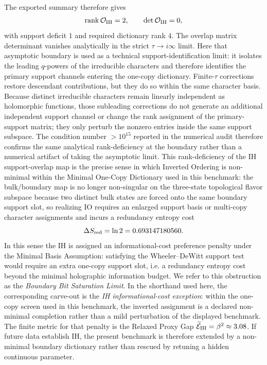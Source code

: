 \documentclass[11pt]{article}
\begin{document}
The exported summary therefore gives
\begin{equation}
 \mathrm{rank}\,\mathcal O_{\rm IH}=2,
 \qquad
 \det\mathcal O_{\rm IH}=0,
\end{equation}
with support deficit $1$ and required dictionary rank $4$. The overlap matrix determinant vanishes analytically in the strict $\tau \to i\infty$ limit. Here that asymptotic boundary is used as a technical support-identification limit: it isolates the leading $q$-powers of the irreducible characters and therefore identifies the primary support channels entering the one-copy dictionary. Finite-$\tau$ corrections restore descendant contributions, but they do so within the same character basis. Because distinct irreducible characters remain linearly independent as holomorphic functions, those subleading corrections do not generate an additional independent support channel or change the rank assignment of the primary-support matrix; they only perturb the nonzero entries inside the same support subspace. The condition number $>10^{15}$ reported in the numerical audit therefore confirms the same analytical rank-deficiency at the boundary rather than a numerical artifact of taking the asymptotic limit. This rank-deficiency of the IH support-overlap map is the precise sense in which Inverted Ordering is non-minimal within the Minimal One-Copy Dictionary used in this benchmark: the bulk/boundary map is no longer non-singular on the three-state topological flavor subspace because two distinct bulk states are forced onto the same boundary support slot, so realizing IO requires an enlarged support basis or multi-copy character assignments and incurs a redundancy entropy cost
\begin{equation}
 \Delta S_{\rm red}=\ln 2 = 0.693147180560.
\end{equation}
In this sense the IH is assigned an informational-cost preference penalty under the Minimal Basis Assumption: satisfying the Wheeler--DeWitt support test would require an extra one-copy support slot, i.e. a redundancy entropy cost beyond the minimal holographic information budget. We refer to this obstruction as the \emph{Boundary Bit Saturation Limit}. In the shorthand used here, the corresponding carve-out is the \emph{IH informational-cost exception}: within the one-copy screen used in this benchmark, the inverted assignment is a declared non-minimal completion rather than a mild perturbation of the displayed benchmark. The finite metric for that penalty is the Relaxed Proxy Gap $\widetilde{\mathcal E}_{\rm IH}=\beta^2\approx3.08$. If future data establish IH, the present benchmark is therefore extended by a non-minimal boundary dictionary rather than rescued by retuning a hidden continuous parameter. %
\end{document}
